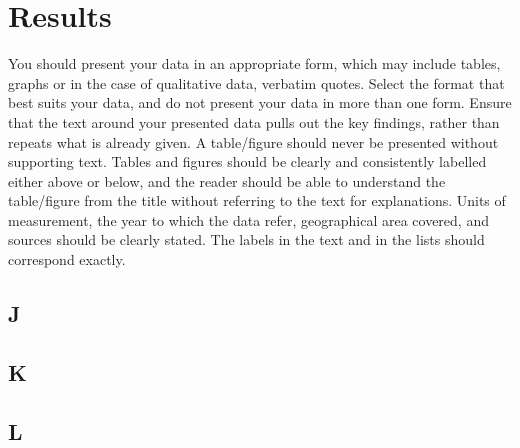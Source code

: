\chapter{Results}\label{ch:results}

You should present your data in an appropriate form, which may include tables, graphs or in the case of qualitative data, verbatim quotes. Select the format that best suits your data, and do not present your data in more than one form. Ensure that the text around your presented data pulls out the key findings, rather than repeats what is already given. A table/figure should never be presented without supporting text. Tables and figures should be clearly and consistently labelled either above or below, and the reader should be able to understand the table/figure from the title without referring to the text for explanations. Units of measurement, the year to which the data refer, geographical area covered, and sources should be clearly stated. The labels in the text and in the lists should correspond exactly.

\section{J}\label{sec:J}
\lipsum[1-5]

\section{K}\label{sec:K}
\lipsum[1-5]

\section{L}\label{sec:L}
\lipsum[1-5]